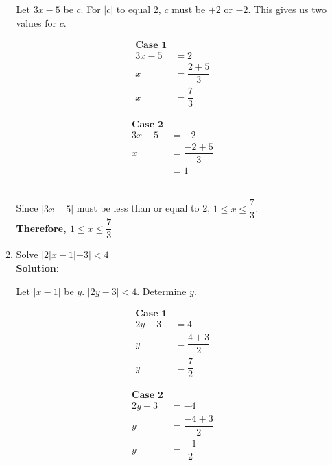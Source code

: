 \documentclass[12pt]{book}
\begin{document}
\begin{enumerate}
\begin{enumerate}
Let $3x-5$ be $c$. For $|c|$ to equal 2, $c$ must be $+2$ or $-2$. This gives us two values for $c$.\\
\begin{minipage}{.5\textwidth}
    \begin{align*}
    \textbf{Case 1}\\
        3x - 5 &= 2\\
        x &= \dfrac{2+5}{3}\\
        x &= \dfrac{7}{3}
    \end{align*}      
    \end{minipage}
    \begin{minipage}{.5\textwidth}
    \begin{align*}
    \textbf{Case 2}\\
        3x - 5 &= - 2\\
        x &= \dfrac{-2 + 5}{3}\\
        &= 1
    \end{align*}
\end{minipage}\\
Since $|3x-5|$ must be less than or equal to 2, $1 \le x \le \dfrac{7}{3}.$\\

\textbf{Therefore, $1 \le x \le \dfrac{7}{3}$\\}
\item Solve $|2|x-1|-3| < 4$\\

\textbf{Solution:}

Let $|x-1|$ be $y$. $|2y - 3| < 4.$ Determine $y$.\\
\begin{minipage}{.5\textwidth}
    \begin{align*}
    \textbf{Case 1}\\
        2y - 3 &= 4\\
        y &= \dfrac{4+3}{2}\\
        y &= \dfrac{7}{2}
    \end{align*}      
    \end{minipage}
    \begin{minipage}{.5\textwidth}
    \begin{align*}
    \textbf{Case 2}\\
        2y - 3 &= -4\\
        y &= \dfrac{-4+3}{2}\\
        y &= \dfrac{-1}{2}
    \end{align*}
\end{minipage}\\


\end{enumerate}
\end{enumerate}
\end{document}
